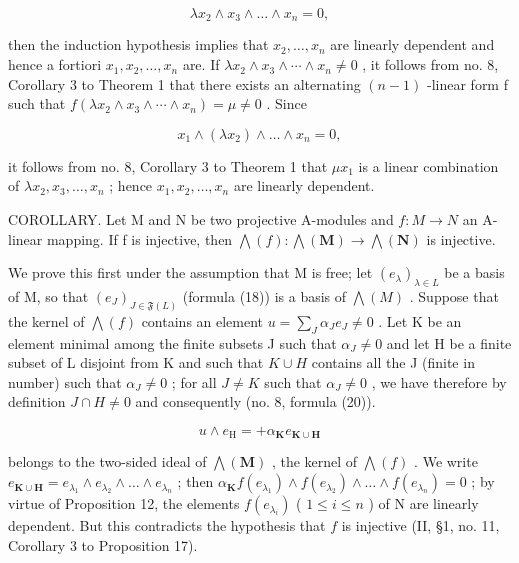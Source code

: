\[
\lambda x _ {2} \wedge x _ {3} \wedge \dots \wedge x _ {n} = 0,
\]

then the induction hypothesis implies that \(x_{2},\ldots,x_{n}\) are linearly dependent and hence a fortiori \(x_{1},x_{2},\ldots,x_{n}\) are. If \(\lambda x_{2}\wedge x_{3}\wedge\cdots\wedge x_{n}\neq0\) , it follows from no. 8, Corollary 3 to Theorem 1 that there exists an alternating \((n-1)\) -linear form f such that \(f(\lambda x_{2}\wedge x_{3}\wedge\cdots\wedge x_{n})=\mu\neq0\) . Since

\[
x _ {1} \wedge (\lambda x _ {2}) \wedge \dots \wedge x _ {n} = 0,
\]

it follows from no. 8, Corollary 3 to Theorem 1 that \(\mu x_{1}\) is a linear combination of \(\lambda x_{2}, x_{3}, \ldots, x_{n}\) ; hence \(x_{1}, x_{2}, \ldots, x_{n}\) are linearly dependent.

COROLLARY. Let M and N be two projective A-modules and \(f:M\to N\) an A-linear mapping. If f is injective, then \(\bigwedge(f):\bigwedge(\mathbf{M})\to\bigwedge(\mathbf{N})\) is injective.

We prove this first under the assumption that M is free; let \((e_{\lambda})_{\lambda \in L}\) be a basis of M, so that \((e_{J})_{J \in \mathfrak{F}(L)}\) (formula (18)) is a basis of \(\bigwedge(M)\) . Suppose that the kernel of \(\bigwedge(f)\) contains an element \(u = \sum_{J} \alpha_{J} e_{J} \neq 0\) . Let K be an element minimal among the finite subsets J such that \(\alpha_{J} \neq 0\) and let H be a finite subset of L disjoint from K and such that \(K \cup H\) contains all the J (finite in number) such that \(\alpha_{J} \neq 0\) ; for all \(J \neq K\) such that \(\alpha_{J} \neq 0\) , we have therefore by definition \(J \cap H \neq 0\) and consequently (no. 8, formula (20)).

\[
u \wedge e _ {\mathrm{H}} = + \alpha_ {\mathbf {K}} e _ {\mathbf {K} \cup \mathbf {H}}
\]

belongs to the two-sided ideal of \(\bigwedge (\mathbf{M})\) , the kernel of \(\bigwedge (f)\) . We write \(e_{\mathbf{K} \cup \mathbf{H}} = e_{\lambda_1} \wedge e_{\lambda_2} \wedge \dots \wedge e_{\lambda_n}\) ; then \(\alpha_{\mathbf{K}} f(e_{\lambda_1}) \wedge f(e_{\lambda_2}) \wedge \dots \wedge f(e_{\lambda_n}) = 0\) ; by virtue of Proposition 12, the elements \(f(e_{\lambda_i})\) ( \(1 \leqslant i \leqslant n\) ) of N are linearly dependent. But this contradicts the hypothesis that \(f\) is injective (II, §1, no. 11, Corollary 3 to Proposition 17).

